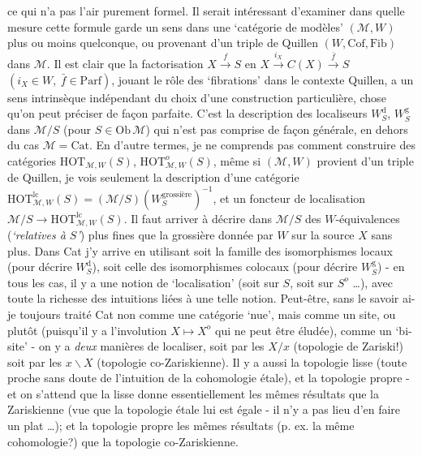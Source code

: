 \documentclass[11pt]{article}
\newcommand{\printedpage}[1]{\marginpar{\footnotesize p.~#1}}
\newcommand{\msp}[1]{\marginpar{\footnotesize [#1]}}
\begin{document}
ce qui n’a pas l’air purement formel. Il serait intéressant d’examiner dans quelle mesure cette formule garde un sens dans une ‘catégorie de modèles’ $(\mathcal{M},W)$ plus ou moins quelconque, ou provenant d’un triple de Quillen $(W,\mathrm{Cof},\mathrm{Fib})$ dans $\mathcal{M}$. Il est clair que la factorisation $X \xrightarrow{f} S$ en $X \xrightarrow{i_X} C(X) \xrightarrow{\bar{f}} S$ $(i_X \in W,\ \bar{f} \in \mathrm{Parf})$, jouant le rôle des ‘fibrations’ dans le contexte Quillen, a un sens intrinsèque indépendant du choix d’une construction particulière, chose qu’on peut préciser de façon parfaite. C’est la description des localiseurs $W_S^{\mathrm{d}}$, $W_S^{\mathrm{g}}$ dans $\mathcal{M}/S$ (pour $S \in \mathrm{Ob}\,\mathcal{M}$) qui n’est pas comprise de façon générale, en dehors du cas $\mathcal{M} = \mathrm{Cat}$. En d’autre termes, je ne comprends pas comment construire des catégories $\mathrm{HOT}_{\mathcal{M},W}(S)$, $\mathrm{HOT}^{o}_{\mathcal{M},W}(S)$, même si $(\mathcal{M},W)$ provient d’un triple de Quillen, je vois seulement la description d’une catégorie $\mathrm{HOT}^{\mathrm{lc}}_{\mathcal{M},W}(S) = (\mathcal{M}/S)(W_S^{\text{grossière}})^{-1}$, et un foncteur de localisation $\mathcal{M}/S \longrightarrow \mathrm{HOT}^{\mathrm{lc}}_{\mathcal{M},W}(S)$. Il faut arriver à décrire dans $\mathcal{M}/S$ des $W$-équivalences (\textit{‘relatives à $S$’}) plus fines que la grossière donnée par $W$ sur la source $X$ sans plus. Dans Cat j’y arrive en utilisant soit la famille des isomorphismes locaux (pour décrire $W_S^{\mathrm{d}}$), soit celle des isomorphismes colocaux (pour décrire $W_S^{\mathrm{g}}$) - en tous les cas, il y a une notion de ‘localisation’ (soit sur $S$, soit sur $S^{o}$ \dots), avec %
\msp{page 83}
toute la richesse des intuitions liées à une telle notion. Peut-être, sans le savoir ai-je toujours traité Cat non comme une catégorie ‘nue’, mais comme un site, ou plutôt (puisqu’il
\printedpage{53}
y a l’involution $X \longmapsto X^{o}$ qui ne peut être éludée), comme un ‘bi-site’ - on y a \textit{deux} manières de localiser, soit par les $X/x$ (topologie de Zariski!) soit par les $x\backslash X$ (topologie co-Zariskienne). Il y a aussi la topologie lisse (toute proche sans doute de l’intuition de la cohomologie étale), et la topologie propre - et on s’attend que la lisse donne essentiellement les mêmes résultats que la Zariskienne (vue que la topologie étale lui est égale - il n’y a pas lieu d’en faire un plat \dots); et la topologie propre les mêmes résultats (p. ex. la même cohomologie?) que la topologie co-Zariskienne. %
\end{document}

